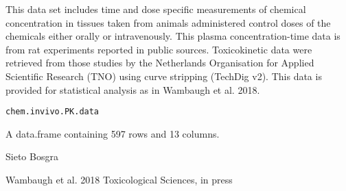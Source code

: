 \documentclass[a4paper]{book}
\begin{document}
%
\begin{Description}\relax
This data set includes time and dose specific measurements of chemical
concentration in tissues taken from animals administered control doses of
the chemicals either orally or intravenously. This plasma concentration-time
data is from rat experiments reported in public sources. Toxicokinetic data
were retrieved from those studies by the Netherlands Organisation for
Applied Scientific Research (TNO) using curve stripping (TechDig v2).  This
data is provided for statistical analysis as in Wambaugh et al. 2018.
\end{Description}
%
\begin{Usage}
\begin{verbatim}
chem.invivo.PK.data
\end{verbatim}
\end{Usage}
%
\begin{Format}
A data.frame containing 597 rows and 13 columns.
\end{Format}
%
\begin{Author}\relax
Sieto Bosgra
\end{Author}
%
\begin{Source}\relax
Wambaugh et al. 2018 Toxicological Sciences, in press
\end{Source}
%
\end{document}
